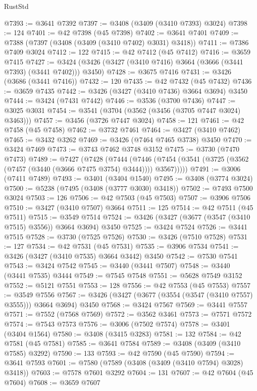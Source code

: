 \begin{lexlean}{RustStd}
\begin{coremodule}
@7393 := @3641 @7392
@7397 := @3408 (@3409 (@3410 @7393) @3024)
@7398 := 124
@7401 := @42 @7398 (@45 @7398)
@7402 := @3641 @7401
@7409 := @7388 (@7397 (@3408 (@3409 (@3410 @7402) @3031) @3418))
@7411 := @7386 @7409 @3024
@7412 := 122
@7415 := @42 @7412 (@45 @7412)
@7416 := @3659 @7415
@7427 := @3424 (@3426 (@3427 (@3410 @7416) @3664 (@3666 (@3441 @7393) (@3441 @7402))) @3450)
@7428 := @3675 @7416
@7431 := @3426 (@3686 (@3441 @7416))
@7432 := 120
@7435 := @42 @7432 (@45 @7432)
@7436 := @3659 @7435
@7442 := @3426 (@3427 (@3410 @7436) @3664 @3694) @3450
@7444 := @3424 (@7431 @7442)
@7446 := @3536 (@3700 @7436)
@7447 := @3025 @3031
@7454 := @3541 (@3704 (@3562 (@3456 (@3705 @7447 @3024) @3463)))
@7457 := @3456 (@3726 @7447 @3024)
@7458 := 121
@7461 := @42 @7458 (@45 @7458)
@7462 := @3732 @7461
@7464 := @3427 (@3410 @7462)
@7465 := @3432 @3262
@7469 := @3426 (@7464 @7465 @3738) @3450
@7470 := @3424 @7469
@7473 := @3743 @7462 @3748 @3152
@7475 := @3730 (@7470 @7473)
@7489 := @7427
    (@7428
      (@7444
        (@7446 (@7454 (@3541 (@3725 (@3562 (@7457 (@3440 (@3666 @7475 @3754) @3444)))) @3567)))))
@7491 := @3006 (@7411 @7489)
@7493 := @3401 (@3404 @1540)
@7495 := @3408 (@3774 @3024)
@7500 := @5238 (@7495 (@3408 (@3777 @3030) @3418))
@7502 := @7493 @7500 @3024
@7503 := 126
@7506 := @42 @7503 (@45 @7503)
@7507 := @3906 @7506
@7510 := @3427 (@3410 @7507) @3664
@7511 := 125
@7514 := @42 @7511 (@45 @7511)
@7515 := @3549 @7514
@7524 := @3426 (@3427 (@3677 (@3547 (@3410 @7515) @3556)) @3664 @3694) @3450
@7525 := @3424 @7524
@7526 := @3441 @7515
@7528 := @3730 (@7525 @7526)
@7530 := @3426 (@7510 @7528)
@7531 := 127
@7534 := @42 @7531 (@45 @7531)
@7535 := @3906 @7534
@7541 := @3426 (@3427 (@3410 @7535) @3664 @3442) @3450
@7542 := @7530 @7541
@7543 := @3424 @7542
@7545 := @3440 (@3441 @7507)
@7548 := @3440 (@3441 @7535) @3444
@7549 := @7545 @7548
@7551 := @5628 @7549 @3152
@7552 := @5121 @7551
@7553 := 128
@7556 := @42 @7553 (@45 @7553)
@7557 := @3549 @7556
@7567 := @3426 (@3427 (@3677 (@3554 (@3547 (@3410 @7557) @3555))) @3664 @3694) @3450
@7568 := @3424 @7567
@7569 := @3441 @7557
@7571 := @7552 (@7568 @7569)
@7572 := @3562 @3461
@7573 := @7571 @7572
@7574 := @7543 @7573
@7576 := @3006 (@7502 @7574)
@7578 := @3401 (@3404 @1564)
@7580 := @3408 (@3415 @3283)
@7581 := 132
@7584 := @42 @7581 (@45 @7581)
@7585 := @3641 @7584
@7589 := @3408 (@3409 (@3410 @7585) @3292)
@7590 := 133
@7593 := @42 @7590 (@45 @7590)
@7594 := @3641 @7593
@7601 := @7580 (@7589 (@3408 (@3409 (@3410 @7594) @3028) @3418))
@7603 := @7578 @7601 @3292
@7604 := 131
@7607 := @42 @7604 (@45 @7604)
@7608 := @3659 @7607

\end{coremodule}
\end{lexlean}
